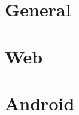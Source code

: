 




\maketitle
\tableofcontents

% 
\part{General}










\part{Web}







\part{Android}






